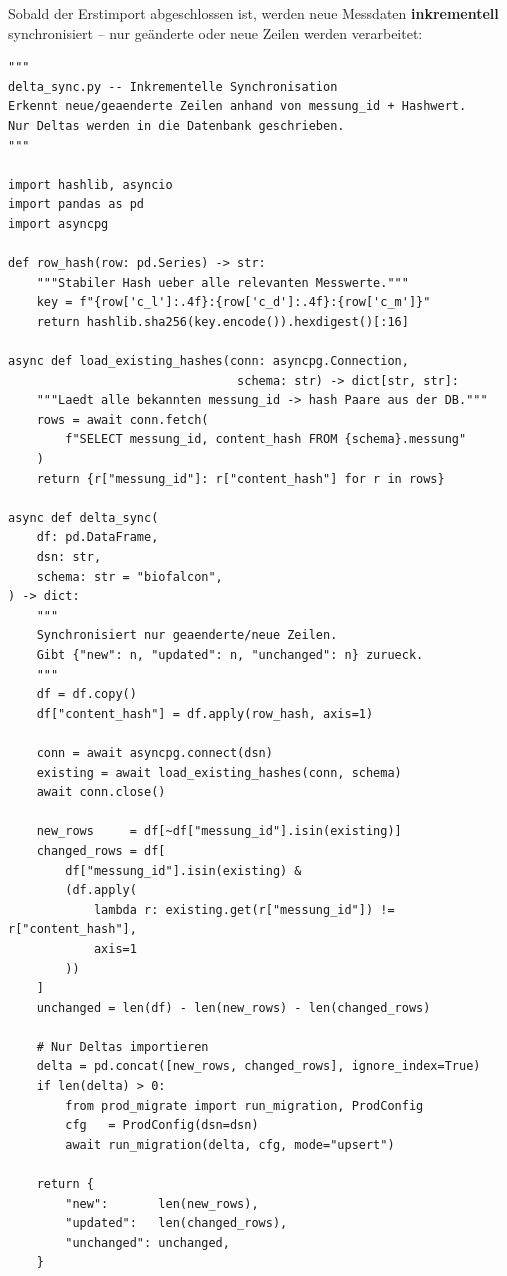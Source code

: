 ﻿\documentclass[12pt,a4paper]{report}
\theoremstyle{definition}
\theoremstyle{remark}
\begin{document}
Sobald der Erstimport abgeschlossen ist, werden neue Messdaten
\textbf{inkrementell} synchronisiert -- nur geänderte oder neue
Zeilen werden verarbeitet:

\begin{lstlisting}[style=python, caption={delta\_sync.py: Inkrementelle Synchronisation neuer Messdaten}]
"""
delta_sync.py -- Inkrementelle Synchronisation
Erkennt neue/geaenderte Zeilen anhand von messung_id + Hashwert.
Nur Deltas werden in die Datenbank geschrieben.
"""

import hashlib, asyncio
import pandas as pd
import asyncpg

def row_hash(row: pd.Series) -> str:
    """Stabiler Hash ueber alle relevanten Messwerte."""
    key = f"{row['c_l']:.4f}:{row['c_d']:.4f}:{row['c_m']}"
    return hashlib.sha256(key.encode()).hexdigest()[:16]

async def load_existing_hashes(conn: asyncpg.Connection,
                                schema: str) -> dict[str, str]:
    """Laedt alle bekannten messung_id -> hash Paare aus der DB."""
    rows = await conn.fetch(
        f"SELECT messung_id, content_hash FROM {schema}.messung"
    )
    return {r["messung_id"]: r["content_hash"] for r in rows}

async def delta_sync(
    df: pd.DataFrame,
    dsn: str,
    schema: str = "biofalcon",
) -> dict:
    """
    Synchronisiert nur geaenderte/neue Zeilen.
    Gibt {"new": n, "updated": n, "unchanged": n} zurueck.
    """
    df = df.copy()
    df["content_hash"] = df.apply(row_hash, axis=1)

    conn = await asyncpg.connect(dsn)
    existing = await load_existing_hashes(conn, schema)
    await conn.close()

    new_rows     = df[~df["messung_id"].isin(existing)]
    changed_rows = df[
        df["messung_id"].isin(existing) &
        (df.apply(
            lambda r: existing.get(r["messung_id"]) != r["content_hash"],
            axis=1
        ))
    ]
    unchanged = len(df) - len(new_rows) - len(changed_rows)

    # Nur Deltas importieren
    delta = pd.concat([new_rows, changed_rows], ignore_index=True)
    if len(delta) > 0:
        from prod_migrate import run_migration, ProdConfig
        cfg   = ProdConfig(dsn=dsn)
        await run_migration(delta, cfg, mode="upsert")

    return {
        "new":       len(new_rows),
        "updated":   len(changed_rows),
        "unchanged": unchanged,
    }
\end{lstlisting}
\end{document}
